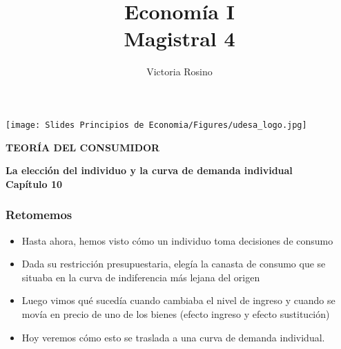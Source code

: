 \documentclass{beamer}
\title[Economía I]{Economía I \vspace{4mm}
\\ Magistral 4}
\date{}
\author[Victoria Rosino]{Victoria Rosino}
\institute[]{Universidad de San Andrés}
\begin{document}
\begin{frame}
\vspace{0.4cm}
\titlepage
\centering
\vspace{-0.7cm}
\texttt{[image: Slides Principios de Economia/Figures/udesa\_logo.jpg]} 
\end{frame}

\begin{frame}
    \centering
    \begin{boxB}
    \centering \Large \textbf{TEORÍA DEL CONSUMIDOR} \\   
    \end{boxB}
     \vspace{2mm}
    \Large \textbf{La elección del individuo y la curva de demanda individual} \\
     \vspace{2mm}
    \large \textbf{Capítulo 10}
\end{frame}

\begin{frame}
\frametitle{Retomemos}
\begin{itemize}
  \item Hasta ahora, hemos visto cómo un individuo toma decisiones de consumo
  \item Dada su restricción presupuestaria, elegía la canasta de consumo que se situaba en la curva de indiferencia más lejana del origen
  \item Luego vimos qué sucedía cuando cambiaba el nivel de ingreso y cuando se movía en precio de uno de los bienes (efecto ingreso y efecto sustitución) 
  \item Hoy veremos cómo esto se traslada a una curva de demanda individual.
\end{itemize}
\end{frame}
\end{document}
